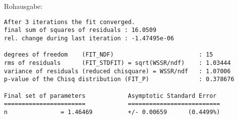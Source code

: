     \vspace{-\baselineskip}
    Rohausgabe:
    \begin{verbatim}
After 3 iterations the fit converged.
final sum of squares of residuals : 16.0509
rel. change during last iteration : -1.47495e-06

degrees of freedom    (FIT_NDF)                        : 15
rms of residuals      (FIT_STDFIT) = sqrt(WSSR/ndf)    : 1.03444
variance of residuals (reduced chisquare) = WSSR/ndf   : 1.07006
p-value of the Chisq distribution (FIT_P)              : 0.378676

Final set of parameters            Asymptotic Standard Error
=======================            ==========================
n               = 1.46469          +/- 0.00659      (0.4499%)
    \end{verbatim}

